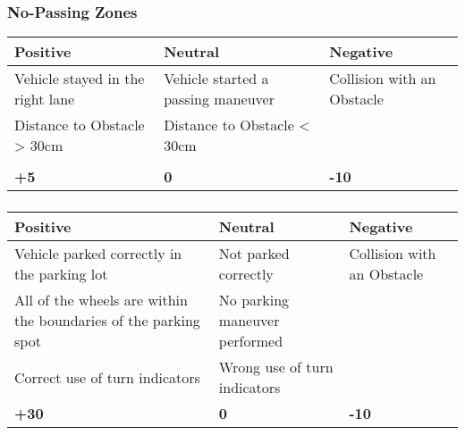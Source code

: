 {	

	\subsubsection*{No-Passing Zones}
	\begin{table}[H]
		\begin{tabularx}{\textwidth}{XXX}
			\toprule
			\textbf{Positive}                & \textbf{Neutral}                   & \textbf{Negative}          \\
			\midrule
			Vehicle stayed in the right lane & Vehicle started a passing maneuver & Collision with an Obstacle \\
			Distance to Obstacle > 30cm      & Distance to Obstacle < 30cm        &                            \\
			                                 &                                    &                            \\
			\topstrut
			\textbf{+5}                      & \textbf{0}                         & \textbf{-10}               \\
			\bottomrule
		\end{tabularx}
	\end{table}

	\clearpage

	
	\subsubsection*{}
	\begin{table}[H]
		\begin{tabularx}{\textwidth}{XXX}
			\toprule
			\textbf{Positive}                                           & \textbf{Neutral}                                                  & \textbf{Negative}          \\
			\midrule
			Vehicle parked correctly in the parking lot                 & Not parked correctly                                              & Collision with an Obstacle \\
			All of the wheels are within the boundaries of the parking spot& No parking maneuver performed                                  &                            \\
			Correct use of turn indicators                              & Wrong use of turn indicators                                      &                            \\
			\topstrut
			\textbf{+30}                                                & \textbf{0}                                                        & \textbf{-10}               \\
			\bottomrule
		\end{tabularx}
	\end{table}

}
